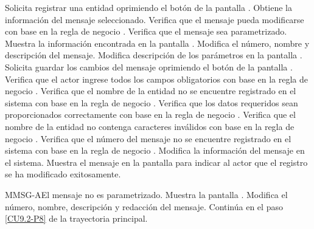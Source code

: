 	\begin{UCtrayectoria}
		\UCpaso[\UCactor] Solicita registrar una entidad oprimiendo el botón \editar de la pantalla .
		\UCpaso[\UCsist] Obtiene la información del mensaje seleccionado.
		\UCpaso[\UCsist] Verifica que el mensaje pueda modificarse con base en la regla de negocio . 
		\UCpaso[\UCsist] Verifica que el mensaje sea parametrizado.
		\UCpaso[\UCsist] Muestra la información encontrada en la pantalla . 
		\UCpaso[\UCactor] Modifica el número, nombre y descripción del mensaje. \label{CU9.2-P6}
		\UCpaso[\UCactor] Modifica descripción de los parámetros en la pantalla .
		\UCpaso[\UCactor] Solicita guardar los cambios del mensaje oprimiendo el botón  de la pantalla . \label{CU9.2-P8}  
		\UCpaso[\UCsist] Verifica que el actor ingrese todos los campos obligatorios con base en la regla de negocio . 
		\UCpaso[\UCsist] Verifica que el nombre de la entidad no se encuentre registrado en el sistema con base en la regla de negocio . 
		\UCpaso[\UCsist] Verifica que los datos requeridos sean proporcionados correctamente con base en la regla de negocio .  
		\UCpaso[\UCsist] Verifica que el nombre de la entidad no contenga caracteres inválidos con base en la regla de negocio . 
		\UCpaso[\UCsist] Verifica que el número del mensaje no se encuentre registrado en el sistema con base en la regla de negocio .  
		\UCpaso[\UCsist] Modifica la información del mensaje en el sistema.
		\UCpaso[\UCsist] Muestra el mensaje  en la pantalla  para indicar al actor que el registro se ha modificado exitosamente.
	\end{UCtrayectoria}		
	
	\begin{UCtrayectoriaA}{MMSG-A}{El mensaje no es parametrizado.}
		\UCpaso[\UCsist] Muestra la pantalla .
		\UCpaso[\UCactor] Modifica el número, nombre, descripción y redacción del mensaje. \label{CU9.2-AP-2}
		\UCpaso[\UCsist] Continúa en el paso \ref{CU9.2-P8} de la trayectoria principal.
	\end{UCtrayectoriaA}


